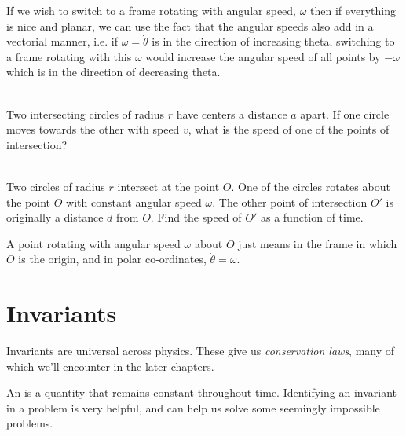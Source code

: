     If we wish to switch to a frame rotating with angular speed, $\omega$ then if everything is nice and planar, 
    we can use the fact that the angular speeds also add in a vectorial manner, i.e. if $\omega = \dot{\theta}$
    is in the direction of increasing theta, switching to a frame rotating with this $\omega$ would increase 
    the angular speed of all points by $-\omega$ which is in the direction of decreasing theta.

    \begin{exc}
        \begin{exercise}[subtitle={Symmetrical Circles, Kalda}, points = 2]
            \smallskip
            ~\\
            Two intersecting circles of radius $r$ have centers a distance $a$ apart. If one circle moves towards the other with 
            speed $v$, what is the speed of one of the points of intersection?
        \end{exercise}
        \begin{exercise}[subtitle={Rotating Circles, Kalda}, points = 3]
            \smallskip
            ~\\
            Two circles of radius $r$ intersect at the point $O$. One of the circles rotates
            about the point $O$ with constant angular speed $\omega$. The other point of intersection $O'$ is originally a
            distance $d$ from $O$. Find the speed of $O'$ as a function of time.

            A point rotating with angular speed $\omega$ about $O$ just means in the frame in which $O$ is the origin, 
            and in polar co-ordinates, $\dot{\theta} = \omega$. 
        \end{exercise}
    \end{exc}

    \section{Invariants}

    Invariants are universal across physics. These give us \emph{conservation laws}, many of which we'll encounter in the 
    later chapters.

    An  is a quantity that remains constant throughout time. Identifying an invariant in a problem is very
    helpful, and can help us solve some seemingly impossible problems. 


